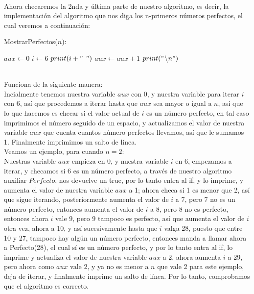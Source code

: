 \documentclass[12pt,twoside]{article}
\begin{document}
\newline
\\ Ahora checaremos la 2nda y última parte de nuestro algoritmo, es decir, la implementación del algoritmo que nos diga los n-primeros números perfectos, el cual veremos a continuación:
\begin{algorithm}
    \caption{MostrarPerfectos($n$):}
    \begin{algorithmic}
        \State $aux \gets 0$
        \State $i \gets 6$
                \State $print(i+ "$ $")$
                \State $aux \gets aux+1$
            \EndIf
        \EndFor
        \State $print("$\textbackslash $n")$
    \end{algorithmic}
\end{algorithm}
\\ Funciona de la siguiente manera:
\\ Incialmente tenemos nuestra variable $aux$ con 0, y nuestra variable para iterar $i$ con 6, así que procedemos a iterar hasta que $aux$ sea mayor o igual a $n$, así que lo que hacemos es checar si el valor actual de $i$ es un número perfecto, en tal caso imprimimos el número seguido de un espacio, y actualizamos el valor de nuestra variable $aux$ que cuenta cuantos número perfectos llevamos, así que le sumamos 1. Finalmente imprimimos un salto de línea.
\newline
\\ Veamos un ejemplo, para cuando $n=2$:
\\ Nuestras variable $aux$ empieza en 0, y nuestra variable $i$ en 6, empezamos a iterar, y checamos si 6 es un número perfecto, a través de nuestro algoritmo auxiliar $Perfecto$, nos devuelve un true, por lo tanto entra al if, y lo imprime, y aumenta el valor de nuestra variable $aux$ a 1; ahora checa si 1 es menor que 2, así que sigue iterando, posteriormente aumenta el valor de $i$ a 7, pero 7 no es un número perfecto, entonces aumenta el valor de $i$ a 8, pero 8 no es perfecto, entonces ahora $i$ vale 9, pero 9 tampoco es perfecto, así que aumenta el valor de $i$ otra vez, ahora a 10, y así sucesivamente hasta que $i$ valga 28, puesto que entre 10 y 27, tampoco hay algún un número perfecto, entonces manda a llamar ahora a Perfecto(28), el cual sí es un número perfecto, y por lo tanto entra al if, lo imprime y actualiza el valor de nuestra variable $aux$ a 2, ahora aumenta $i$ a 29, pero ahora como $aux$ vale 2, y ya no es menor a $n$ que vale 2 para este ejemplo, deja de iterar, y finalmente imprime un salto de línea. Por lo tanto, comprobamos que el algoritmo es correcto.
\end{document}
